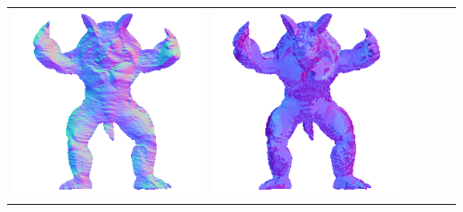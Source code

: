 \begin{tabularx}{\linewidth}{@{}Y@{}Y@{}Y@{}Y@{}Y@{}Y@{}}
\includegraphics[width=\linewidth]{semisynthetic/20160617_22_yu_out.png} &
\includegraphics[width=\linewidth]{semisynthetic/20160617_22_dpsn_out.png} &

\end{tabularx}
